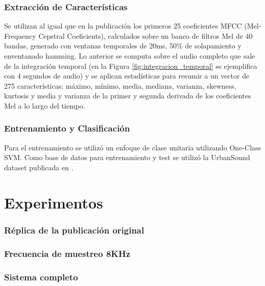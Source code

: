 \documentclass{article}
\begin{document}
\subsubsection*{Extracción de Características}
Se utilizan al igual que en la publicación \cite{Salamon:UrbanSound:ACMMM:14} los primeros 25 coeficientes MFCC (Mel-Frequency Cepstral Coeficients), calculados sobre un banco de filtros Mel de 40 bandas, generado con ventanas temporales de 20ms, 50\% de solapamiento y enventanado hamming. Lo anterior se computa sobre el audio completo que sale de la integración temporal (en la Figura \ref{fig:integracion_temporal} se ejemplifica con 4 segundos de audio) y se aplican estadísticas para resumir a un vector de 275 características: máximo, mínimo, media, mediana, varianza, skewness, kurtosis y media y varianza de la primer y segunda derivada de los coeficientes Mel a lo largo del tiempo.

\subsubsection*{Entrenamiento y Clasificación}
Para el entrenamiento se utilizó un enfoque de clase unitaria utilizando One-Class SVM. Como base de datos para entrenamiento y test se utilizó la UrbanSound dataset publicada en \cite{Salamon:UrbanSound:ACMMM:14}. 


\section{Experimentos}
\label{experimentos}

\subsubsection*{Réplica de la publicación original}

\subsubsection*{Frecuencia de muestreo 8KHz}

\subsubsection*{Sistema completo}
\end{document}
